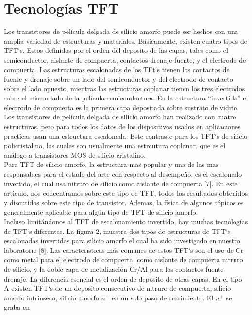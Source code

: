 \documentclass[conference]{IEEEtran}
\begin{document}
\section{Tecnologías TFT}
    Los transistores de película delgada de silicio amorfo puede ser hechos con una amplia
    variedad de estructuras y materiales. Básicamente, existen cuatro tipos
    de TFT`s, Estos definidos por el orden del deposito de las capas, tales como el semiconductor,
    aislante de compuerta, contactos drenaje-fuente, y el electrodo de
    compuerta. Las estructuras escalonadas de los TFt`s tienen los contactos de fuente y drenaje
    sobre un lado del semiconductor y del electrodo de contacto sobre el lado opuesto,
    mientras las estructuras coplanar tienen los tres electrodos sobre
    el mismo lado de la película semiconductora. En la estructura ``invertida'' el
    electrodo de compuerta es la primera capa depositada sobre sustrato de vidrio.
    Los transistores de película delgada de silicio amorfo han realizado con cuatro estructuras,
    pero para todos los datos de los dispositivos usados en aplicaciones
    practicas usan una estructura escalonada. Este contraste para los TFT`s de silicio
    policristalino, los cuales son usualmente una estrcutura coplanar, que es el análogo 
    a transistores MOS de silicio cristalino.
    \\
    Para TFT de silicio amorfo, la estructura mas popular y una de las mas responsables
    para el estado del arte con respecto al desempeño, es el escalonado invertido, el
    cual usa nitruro de silicio como aislante de compuerta [7]. En este articulo, nos
    concentramos sobre este tipo de TFT, todos los resultados obtenidos y discutidos
    sobre este tipo de transistor. Ademas, la física de algunos tópicos es generalmente
    aplicable para algún tipo de TFT de silicio amorfo.
    \\
    Incluso limitándonos al TFT de escalonamiento invertido, hay muchas tecnologías 
    de TFT`s diferentes. La figura 2, muestra dos tipos de estructuras de TFT`s
    escalonadas invertidas para silicio amorfo el cual ha sido investigado en nuestro
    laboratorio [8]. Las características más comunes de estos TFT`s son el uso de Cr como
    metal para el electrodo de compuerta, como aislante de compuerta nitruro de
    silicio, y la doble capa de metalización Cr/Al para los contactos fuente drenaje.
    La diferencia esencial es el orden de deposito de otras capas. En el tipo A
    existen TFT`s de un deposito consecutivo de nitruro de compuerta, silicio amorfo
    intrínseco, silicio amorfo $n^+$ en un solo paso de crecimiento. El $n^+$ se graba en
\end{document}
